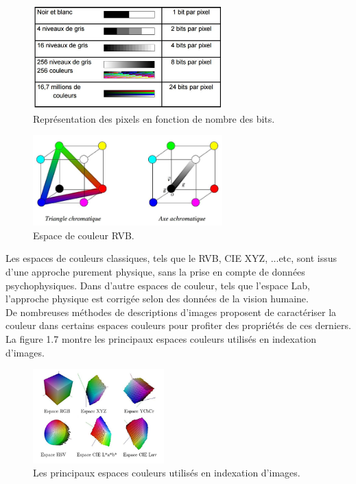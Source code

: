 \begin{figure}[H]
	\label{fig:tableRVB}
	\centering
	\includegraphics[width=0.65\textwidth]{Figures/tableRVB} %
	
	\caption{Représentation des pixels en fonction de nombre des bits.}
	
\end{figure}
\begin{figure}[H]
	\label{fig:espaceRVB}
	\centering
	\includegraphics[width=0.65\textwidth]{Figures/espaceRVB} %
	\caption{Espace de couleur RVB.}
\end{figure}

Les espaces de couleurs classiques, tels que le RVB, CIE XYZ, ...etc, sont issus d'une approche purement physique, sans la prise en compte de données psychophysiques. Dans d'autre espaces de couleur, tels que l'espace Lab, l'approche physique est corrigée selon des données de la vision humaine.\\

De nombreuses méthodes de descriptions d'images proposent de caractériser la couleur dans certains espaces couleurs pour profiter des propriétés de ces derniers. La figure 1.7 montre les principaux espaces couleurs utilisés en indexation d’images.

\begin{figure}[H]
	\label{fig:espaceCouleur}
	\centering
	\includegraphics[width=0.45\textwidth]{Figures/espaceCouleur} %
	\caption{Les principaux espaces couleurs utilisés en indexation d'images.}
	
\end{figure}

